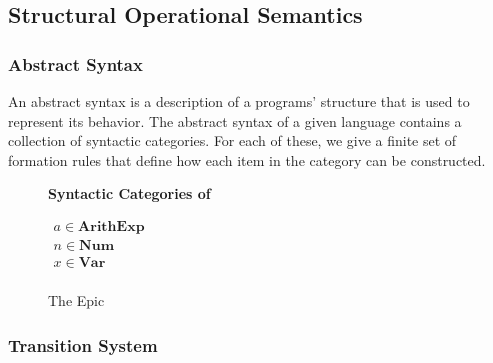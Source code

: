 \subsection{Structural Operational Semantics}

\subsubsection*{Abstract Syntax}
An abstract syntax is a description of a programs' structure that is used to represent its behavior. 
The abstract syntax of a given language contains a collection of syntactic categories. 
For each of these, we give a finite set of formation rules that define how each item in the category can be constructed.

\begin{figure}[htbp]
	\begin{center}
		\textbf{Syntactic Categories of \dazel{}}
		\vspace{4mm}


		\begin{math}
			\begin{gather*}
				a \in \textbf{ArithExp} &\\ 
				n \in \textbf{Num} &\\
				x \in \textbf{Var} &\\
			\end{gather*}
		\end{math}
	\end{center}
	\caption{The Epic}
	\label{aaa}
\end{figure}

\subsubsection*{Transition System}
